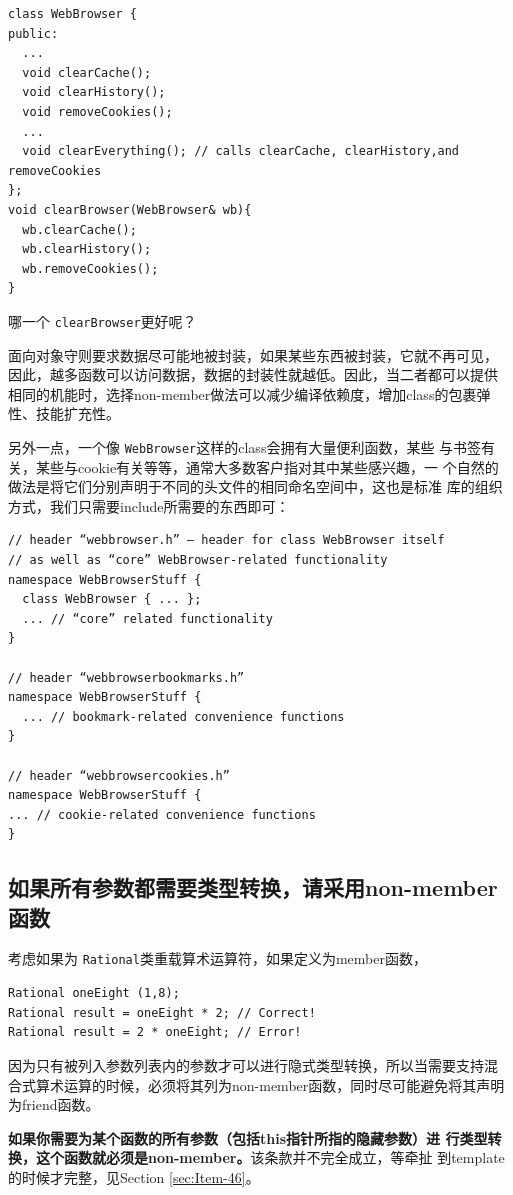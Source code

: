\documentclass[a4paper,twoside]{article}
\theoremstyle{definition}
\theoremstyle{remark}
\numberwithin{equation}{section}
\let\OldTexttt\texttt
\renewcommand{\texttt}[1]{{\color{blue} \OldTexttt{#1}}}
\begin{document}
\begin{verbatim}
class WebBrowser {
public:
  ...
  void clearCache();
  void clearHistory();
  void removeCookies();
  ...
  void clearEverything(); // calls clearCache, clearHistory,and removeCookies
};
void clearBrowser(WebBrowser& wb){
  wb.clearCache();
  wb.clearHistory();
  wb.removeCookies();
}
\end{verbatim}
哪一个\texttt{clearBrowser}更好呢？

面向对象守则要求数据尽可能地被封装，如果某些东西被封装，它就不再可见，
因此，越多函数可以访问数据，数据的封装性就越低。因此，当二者都可以提供
相同的机能时，选择non-member做法可以减少编译依赖度，增加class的包裹弹
性、技能扩充性。

另外一点，一个像\texttt{WebBrowser}这样的class会拥有大量便利函数，某些
与书签有关，某些与cookie有关等等，通常大多数客户指对其中某些感兴趣，一
个自然的做法是将它们分别声明于不同的头文件的相同命名空间中，这也是标准
库的组织方式，我们只需要include所需要的东西即可：
\begin{verbatim}
// header “webbrowser.h” — header for class WebBrowser itself 
// as well as “core” WebBrowser-related functionality
namespace WebBrowserStuff {
  class WebBrowser { ... };
  ... // “core” related functionality
}

// header “webbrowserbookmarks.h”
namespace WebBrowserStuff {
  ... // bookmark-related convenience functions
} 

// header “webbrowsercookies.h”
namespace WebBrowserStuff {
... // cookie-related convenience functions
}
\end{verbatim}

\subsection{如果所有参数都需要类型转换，请采用non-member函数}
\label{sec:Item-24}

考虑如果为\texttt{Rational}类重载算术运算符，如果定义为member函数，
\begin{verbatim}
Rational oneEight (1,8);
Rational result = oneEight * 2; // Correct!
Rational result = 2 * oneEight; // Error!
\end{verbatim}
因为只有被列入参数列表内的参数才可以进行隐式类型转换，所以当需要支持混
合式算术运算的时候，必须将其列为non-member函数，同时尽可能避免将其声明
为friend函数。

\textbf{如果你需要为某个函数的所有参数（包括this指针所指的隐藏参数）进
  行类型转换，这个函数就必须是non-member。}该条款并不完全成立，等牵扯
到template的时候才完整，见Section \ref{sec:Item-46}。
\end{document}

